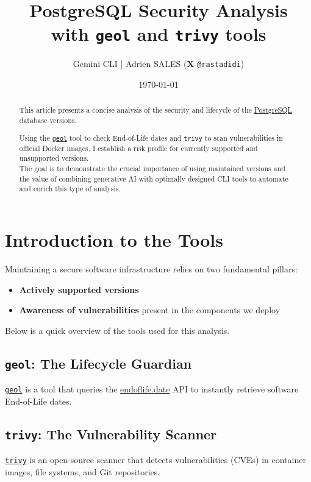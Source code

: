 \documentclass[11pt, a4paper]{article}
\title{PostgreSQL Security Analysis\\ \large with \texttt{geol} and \texttt{trivy} tools}
\author{Gemini CLI | Adrien SALES ($\mathbf{X}$ \texttt{@rastadidi})}
\date{\today}
\begin{document}
\maketitle

\begin{abstract}
This article presents a concise analysis of the security and lifecycle of
the \href{https://www.postgresql.org/}{PostgreSQL} database versions.

Using the \href{https://github.com/opt-nc/geol}{\texttt{geol}} tool to check End-of-Life dates and \texttt{trivy} to scan vulnerabilities in official Docker images, I establish a risk profile for currently supported and unsupported versions.\\

The goal is to demonstrate the crucial importance of using maintained versions and the value of combining generative AI with optimally designed CLI tools to automate and enrich this type of analysis.
\end{abstract}

\section{Introduction to the Tools}

Maintaining a secure software infrastructure relies on two fundamental pillars:

\begin{itemize}
    \item \textbf{Actively supported versions}
    \item \textbf{Awareness of vulnerabilities} present in the components we deploy
\end{itemize}

Below is a quick overview of the tools used for this analysis.

\subsection{\texttt{geol}: The Lifecycle Guardian}

\href{https://github.com/opt-nc/geol}{\texttt{geol}} is a tool that queries the \href{https://endoflife.date}{endoflife.date} API to instantly retrieve software End-of-Life dates.

\subsection{\texttt{trivy}: The Vulnerability Scanner}
\href{https://trivy.dev/}{\texttt{trivy}} is an open-source scanner that detects vulnerabilities (CVEs) in container images, file systems, and Git repositories.
\end{document}
